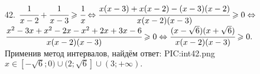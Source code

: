 42. $\cfrac{1}{x-2}+\cfrac{1}{x-3}\geqslant\cfrac{1}{x}\Leftrightarrow \cfrac{x(x-3)+x(x-2)-(x-3)(x-2)}{x(x-2)(x-3)}\geqslant0\Leftrightarrow$\\$
\cfrac{x^2-3x+x^2-2x-x^2+2x+3x-6}{x(x-2)(x-3)}\geqslant0\Leftrightarrow\cfrac{(x-\sqrt{6})(x+\sqrt{6})}{x(x-2)(x-3)}\geqslant0.$\\ Применив метод интервалов, найдём ответ:
{{PIC:int42.png}}
$x\in[-\sqrt{6};0)\cup(2;\sqrt{6}]\cup(3;+\infty).$\\
